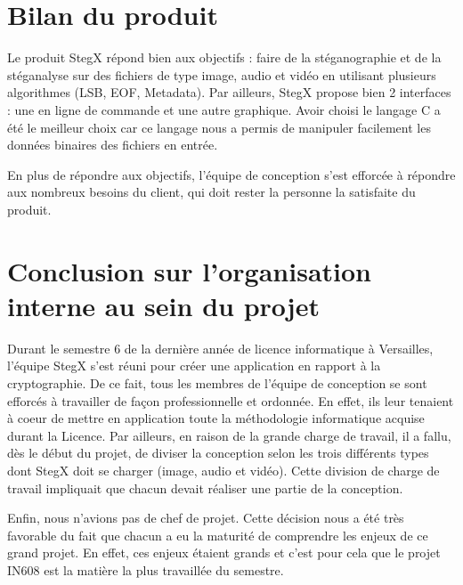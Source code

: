 \documentclass[11pt]{article}
\begin{document}
\section{Bilan du produit}

Le produit StegX répond bien aux objectifs : faire de la stéganographie 
et de la stéganalyse sur des fichiers de type image, audio et vidéo en 
utilisant plusieurs algorithmes (LSB, EOF, Metadata). 
Par ailleurs, StegX propose bien 2 interfaces : une en ligne de commande 
et une autre graphique. 
Avoir choisi le langage C a été le meilleur choix car ce langage nous a 
permis de manipuler facilement les données binaires des fichiers en entrée. 

En plus de répondre aux objectifs, l'équipe de conception s'est efforcée 
à répondre aux nombreux besoins du client, qui doit rester la personne la 
satisfaite du produit. 

\section{Conclusion sur l'organisation interne au sein du projet}

Durant le semestre 6 de la dernière année de licence informatique à Versailles, 
l'équipe StegX s'est réuni pour créer une application en rapport à la 
cryptographie. 
De ce fait, tous les membres de l'équipe de conception se sont efforcés à
travailler de façon professionnelle et ordonnée. En effet, ils leur tenaient 
à coeur de mettre en application toute la méthodologie informatique acquise 
durant la Licence. 
Par ailleurs, en raison de la grande charge de travail, il a fallu, dès le 
début du projet, de diviser la conception selon les trois différents types 
dont StegX doit se charger (image, audio et vidéo). 
Cette division de charge de travail impliquait que chacun devait réaliser 
une partie de la conception. 

Enfin, nous n'avions pas de chef de projet. Cette décision nous a été très 
favorable du fait que chacun a eu la maturité de comprendre les enjeux de 
ce grand projet. En effet, ces enjeux étaient grands et c'est pour cela 
que le projet IN608 est la matière la plus travaillée du semestre. 
\end{document}
